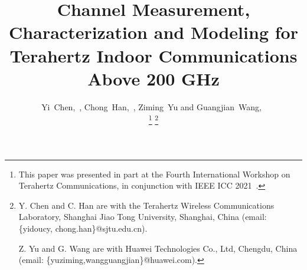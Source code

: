 \documentclass[journal,12pt,draftclsnofoot,onecolumn]{IEEEtran}
\begin{document}



\title{Channel Measurement, Characterization and Modeling for Terahertz Indoor Communications Above 200 GHz} 


\author{Yi~Chen,~, Chong~Han,~, Ziming~Yu and Guangjian~Wang,~

\thanks{
This paper was presented in part at the Fourth International Workshop on Terahertz Communications, in conjunction with IEEE ICC 2021~\cite{he2021channel}. %
}
\thanks{Y. Chen and C. Han are with the Terahertz Wireless Communications Laboratory, Shanghai Jiao Tong University, Shanghai, China (email: \{yidoucy, chong.han\}@sjtu.edu.cn).
\par Z. Yu and G. Wang are with Huawei Technologies Co., Ltd, Chengdu, China (email: \{yuziming,wangguangjian\}@huawei.com).}
}
\maketitle 
\thispagestyle{empty}
\end{document}
